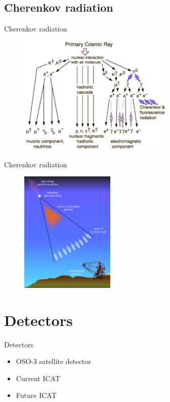 \documentclass{beamer}
\begin{document}
\subsection{Cherenkov radiation}
\begin{frame}{Cherenkov radiation}
	\begin{figure}[h]
		\includegraphics[width=280px]{cara.png}
	\end{figure}
\end{frame}

\begin{frame}{Cherenkov radiation}
	\begin{figure}[h]
		\includegraphics[width=170px]{atmosphere_cerenkov.png}
	\end{figure}
\end{frame}


\section{Detectors}
\begin{frame}{Detectors}
	\begin{itemize}
		\item OSO-3 satellite detector
		\item Current ICAT
		\item Future ICAT
	\end{itemize}
\end{frame}
\end{document}
